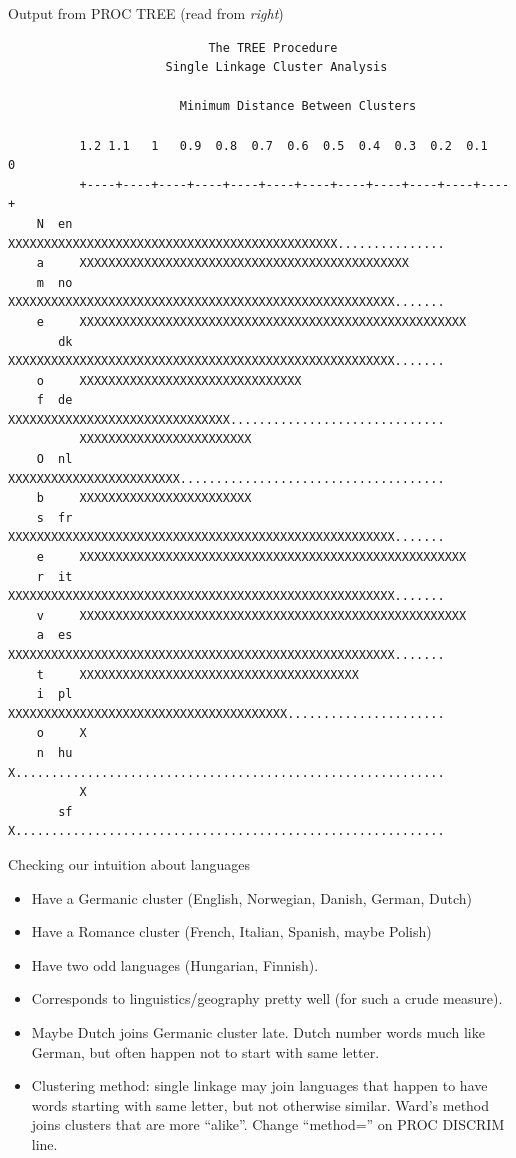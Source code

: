 \documentclass[pdf]{prosper}
\begin{document}
\begin{slide}{Output from PROC TREE (read from {\em right})}

{\tiny
\begin{verbatim}
                            The TREE Procedure
                      Single Linkage Cluster Analysis

                        Minimum Distance Between Clusters

          1.2 1.1   1   0.9  0.8  0.7  0.6  0.5  0.4  0.3  0.2  0.1   0
          +----+----+----+----+----+----+----+----+----+----+----+----+
    N  en XXXXXXXXXXXXXXXXXXXXXXXXXXXXXXXXXXXXXXXXXXXXXX...............
    a     XXXXXXXXXXXXXXXXXXXXXXXXXXXXXXXXXXXXXXXXXXXXXX
    m  no XXXXXXXXXXXXXXXXXXXXXXXXXXXXXXXXXXXXXXXXXXXXXXXXXXXXXX.......
    e     XXXXXXXXXXXXXXXXXXXXXXXXXXXXXXXXXXXXXXXXXXXXXXXXXXXXXX
       dk XXXXXXXXXXXXXXXXXXXXXXXXXXXXXXXXXXXXXXXXXXXXXXXXXXXXXX.......
    o     XXXXXXXXXXXXXXXXXXXXXXXXXXXXXXX
    f  de XXXXXXXXXXXXXXXXXXXXXXXXXXXXXXX..............................
          XXXXXXXXXXXXXXXXXXXXXXXX
    O  nl XXXXXXXXXXXXXXXXXXXXXXXX.....................................
    b     XXXXXXXXXXXXXXXXXXXXXXXX
    s  fr XXXXXXXXXXXXXXXXXXXXXXXXXXXXXXXXXXXXXXXXXXXXXXXXXXXXXX.......
    e     XXXXXXXXXXXXXXXXXXXXXXXXXXXXXXXXXXXXXXXXXXXXXXXXXXXXXX
    r  it XXXXXXXXXXXXXXXXXXXXXXXXXXXXXXXXXXXXXXXXXXXXXXXXXXXXXX.......
    v     XXXXXXXXXXXXXXXXXXXXXXXXXXXXXXXXXXXXXXXXXXXXXXXXXXXXXX
    a  es XXXXXXXXXXXXXXXXXXXXXXXXXXXXXXXXXXXXXXXXXXXXXXXXXXXXXX.......
    t     XXXXXXXXXXXXXXXXXXXXXXXXXXXXXXXXXXXXXXX
    i  pl XXXXXXXXXXXXXXXXXXXXXXXXXXXXXXXXXXXXXXX......................
    o     X
    n  hu X............................................................
          X
       sf X............................................................

\end{verbatim}
}

\end{slide}

\begin{slide}{Checking our intuition about languages}

  \begin{itemize}
  \item Have a Germanic cluster (English, Norwegian, Danish, German, Dutch)
  \item Have a Romance cluster (French, Italian, Spanish, maybe Polish)
  \item Have two odd languages (Hungarian, Finnish).
  \item Corresponds to linguistics/geography pretty well (for such a crude measure).
  \item Maybe Dutch joins Germanic cluster late. Dutch number words much like German, but often happen not to start with same letter.
  \item Clustering method: single linkage may join languages that happen to have words starting with same letter, but not otherwise similar. Ward's method joins clusters that are more ``alike''. Change ``method='' on PROC DISCRIM line.
  \end{itemize}
  
\end{slide}
\end{document}
